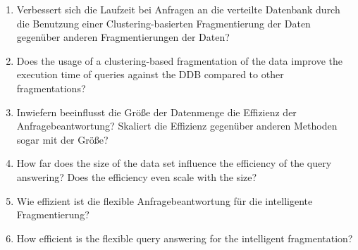 \begin{enumerate}
    \item Verbessert sich die Laufzeit bei Anfragen an die verteilte Datenbank durch die Benutzung einer Clustering-basierten Fragmentierung der Daten
        gegenüber anderen Fragmentierungen der Daten?
    \item Does the usage of a clustering-based fragmentation of the data improve the execution time of queries against the DDB compared to other fragmentations?
    \item Inwiefern beeinflusst die Größe der Datenmenge die Effizienz der Anfragebeantwortung? Skaliert die Effizienz gegenüber anderen Methoden sogar mit der
        Größe?
    \item How far does the size of the data set influence the efficiency of the query answering? Does the efficiency even scale with the size?
    \item Wie effizient ist die flexible Anfragebeantwortung für die intelligente Fragmentierung?
    \item How efficient is the flexible query answering for the intelligent fragmentation?
\end{enumerate}